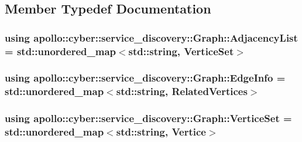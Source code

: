 \subsection{Member Typedef Documentation}
\hypertarget{classapollo_1_1cyber_1_1service__discovery_1_1Graph_a10a571d907b509c8d5026d5209e8edc9}{
\subsubsection[{Adjacency\-List}]{\setlength{\rightskip}{0pt plus 5cm}using {\bf apollo\-::cyber\-::service\-\_\-discovery\-::\-Graph\-::\-Adjacency\-List} =  std\-::unordered\-\_\-map$<$std\-::string, {\bf Vertice\-Set}$>$}}\label{classapollo_1_1cyber_1_1service__discovery_1_1Graph_a10a571d907b509c8d5026d5209e8edc9}
\hypertarget{classapollo_1_1cyber_1_1service__discovery_1_1Graph_ac45189064420abb326708f92fa17205a}{
\subsubsection[{Edge\-Info}]{\setlength{\rightskip}{0pt plus 5cm}using {\bf apollo\-::cyber\-::service\-\_\-discovery\-::\-Graph\-::\-Edge\-Info} =  std\-::unordered\-\_\-map$<$std\-::string, {\bf Related\-Vertices}$>$\hspace{0.3cm}{\ttfamily [private]}}}\label{classapollo_1_1cyber_1_1service__discovery_1_1Graph_ac45189064420abb326708f92fa17205a}
\hypertarget{classapollo_1_1cyber_1_1service__discovery_1_1Graph_ad9bc989f8c0b0495694872a2bb65f008}{
\subsubsection[{Vertice\-Set}]{\setlength{\rightskip}{0pt plus 5cm}using {\bf apollo\-::cyber\-::service\-\_\-discovery\-::\-Graph\-::\-Vertice\-Set} =  std\-::unordered\-\_\-map$<$std\-::string, {\bf Vertice}$>$}}\label{classapollo_1_1cyber_1_1service__discovery_1_1Graph_ad9bc989f8c0b0495694872a2bb65f008}


